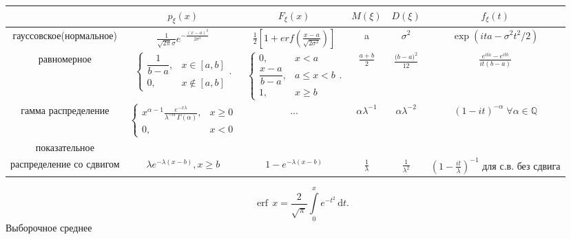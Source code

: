 \documentclass[a4paper, 10pt]{article}
\theoremstyle{definition}
\theoremstyle{remark}
\begin{document}
\begin{center}
    \begin{tabular}{ | c |c c c c c| }
        \hline
        $ $ & $p_\xi(x)$ & $F_\xi(x)$ & $M(\xi)$ & $D(\xi)$ & $f_\xi(t)$\\ 
        \hline
        гауссовское(нормальное) & $\frac1{\sqrt{2\pi}\sigma} e^{-\frac{(x-a)^2}{2\sigma^2}}$ & $\frac12 [1 + erf(\frac{x-a}{\sqrt{2\sigma^2}})]$ & a  & $\sigma^2$ & $\exp (ita - \sigma^2 t^2/2)$\\ 
        
        равномерное & ${\displaystyle\left\{{\begin{matrix}{\dfrac {1}{b-a}},&x\in [a,b]\\0,&x\not \in [a,b]\end{matrix}}\right..}$ &
        ${\displaystyle \left\{{\begin{matrix}0,&x<a\\{\dfrac {x-a}{b-a}},&a\leqslant x<b\\1,&x\geqslant b\end{matrix}}\right..}$ &
        $\frac{a+b}2$ & $\frac{{(b-a})^2}{12}$ & $ \frac{e^{ita} - e^{itb}}{it (b-a)}$ \\


        гамма распределение & $\displaystyle\left\{{\begin{matrix}x^{{\alpha-1}}{\frac  {e^{{-x\lambda }}}{\lambda ^{-\alpha}\,\Gamma (\alpha)}},&x\geq 0\\0,&x<0\end{matrix}}\right.$ & $\dots$ & $\alpha \lambda^{-1}$ & $\alpha \lambda^{-2}$ & $ (1-it)^{-\alpha} \; \forall \alpha \in \mathbb{Q}$\\
     
        показательное \\распределение со сдвигом & 
        $\lambda e^{-\lambda (x-b)}, x\ge b$ & $1 - e^{-\lambda (x-b)}$
        & 
        $\frac1{\lambda}$&$\frac{1}{\lambda^2}$
        &
        $\left(1 - \frac{it}{\lambda}\right)^{-1}\text{ для с.в. без сдвига}$\\
     \hline
    \end{tabular}
    \end{center}
    \[\operatorname {erf}\,x={\frac  {2}{{\sqrt  {\pi }}}}\int \limits _{0}^{x}e^{{-t^{2}}}\,{\mathrm  d}t.\]
Выборочное среднее
\end{document}
